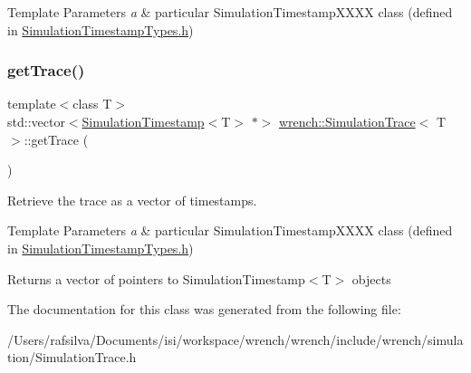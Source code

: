 \begin{DoxyTemplParams}{Template Parameters}
{\em a} & particular Simulation\+Timestamp\+X\+X\+XX class (defined in \hyperlink{_simulation_timestamp_types_8h_source}{Simulation\+Timestamp\+Types.\+h}) \\
\hline
\end{DoxyTemplParams}
\mbox{\label{classwrench_1_1_simulation_trace_a577ad7d82202763c62f0fda28ca8bc56}} 
\subsubsection{\texorpdfstring{get\+Trace()}{getTrace()}}
{\footnotesize\ttfamily template$<$class T$>$ \\
std\+::vector$<$\hyperlink{classwrench_1_1_simulation_timestamp}{Simulation\+Timestamp}$<$T$>$ $\ast$$>$ \hyperlink{classwrench_1_1_simulation_trace}{wrench\+::\+Simulation\+Trace}$<$ T $>$\+::get\+Trace (\begin{DoxyParamCaption}{ }\end{DoxyParamCaption})\hspace{0.3cm}{\ttfamily [inline]}}



Retrieve the trace as a vector of timestamps. 


\begin{DoxyTemplParams}{Template Parameters}
{\em a} & particular Simulation\+Timestamp\+X\+X\+XX class (defined in \hyperlink{_simulation_timestamp_types_8h_source}{Simulation\+Timestamp\+Types.\+h}) \\
\hline
\end{DoxyTemplParams}
\begin{DoxyReturn}{Returns}
a vector of pointers to Simulation\+Timestamp$<$\+T$>$ objects 
\end{DoxyReturn}


The documentation for this class was generated from the following file\+:\begin{DoxyCompactItemize}
\item 
/\+Users/rafsilva/\+Documents/isi/workspace/wrench/wrench/include/wrench/simulation/Simulation\+Trace.\+h\end{DoxyCompactItemize}
